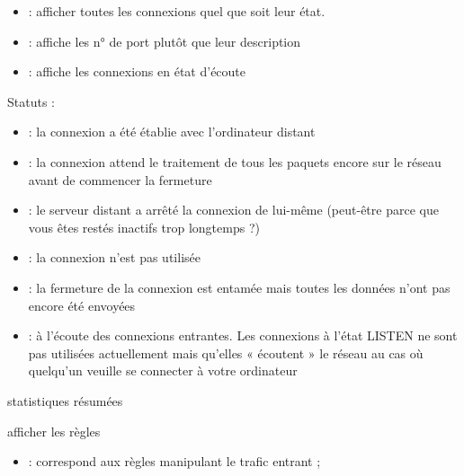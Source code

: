 \documentclass[letterpaper,10pt,french]{sphinxmanual}
\begin{document}
\begin{description}
\begin{itemize}
\item {} 
 : afficher toutes les connexions quel que soit leur état.

\item {} 
 : affiche les n° de port plutôt que leur description

\item {} 
 : affiche les connexions en état d’écoute

\end{itemize}

Statuts :
\begin{itemize}
\item {} 
 : la connexion a été établie avec l’ordinateur distant

\item {} 
 : la connexion attend le traitement de tous les paquets encore sur le réseau avant de commencer la fermeture

\item {} 
 : le serveur distant a arrêté la connexion de lui-même (peut-être parce que vous êtes restés inactifs trop longtemps ?)

\item {} 
 : la connexion n’est pas utilisée

\item {} 
 : la fermeture de la connexion est entamée mais toutes les données n’ont pas encore été envoyées

\item {} 
 : à l’écoute des connexions entrantes. Les connexions à l’état LISTEN ne sont pas utilisées actuellement mais qu’elles « écoutent » le réseau au cas où quelqu’un veuille se connecter à votre ordinateur

\end{itemize}

\item[{\sphinxcode{\sphinxupquote{netstat -s}}}] \leavevmode
statistiques résumées

\item[{\sphinxcode{\sphinxupquote{iptables -L}}}] \leavevmode
afficher les règles
\begin{itemize}
\item {} 
 : correspond aux règles manipulant le trafic entrant ;


\end{itemize}
\end{description}
\end{document}
